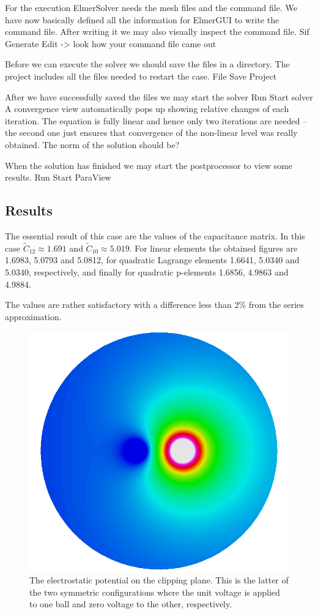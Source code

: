 For the execution 
ElmerSolver needs the mesh files and the command file. We have now basically defined
all the information for ElmerGUI to write the command file. After writing it we may also visually 
inspect the command file.
\ttbegin
Sif 
  Generate
  Edit -> look how your command file came out  
\ttend

Before we can execute the solver we should save the files in a directory. The project includes
all the files needed to restart the case.
\ttbegin
File 
  Save Project
\ttend

After we have successfully saved the files we may start the solver
\ttbegin
Run
  Start solver
\ttend
A convergence view automatically pops up showing relative changes of each iteration.
The equation is fully linear and hence only two iterations are needed -- the second 
one just ensures that convergence of the non-linear level was really obtained. 
The norm of the solution should be?

When the solution has finished we may start the postprocessor to view some results.
\ttbegin
Run
  Start ParaView
\ttend


\subsection*{Results}

The essential result of this case are the values of the capacitance matrix.
In this case $\tilde{C}_{12} \approx 1.691$ and $\tilde{C}_{10} \approx 5.019$.
For linear elements the obtained figures are 1.6983, 5.0793 and 5.0812, 
for quadratic Lagrange elements 1.6641, 5.0340 and 5.0340, respectively, and
finally for quadratic p-elements 1.6856, 4.9863 and 4.9884. 

The values are rather satisfactory with a difference less than 2\% from the series approximation.


\begin{figure}[h]
\centering
\includegraphics[width=120 mm]{ElmerPost_capture2}
\caption{The electrostatic potential on the clipping plane. This is the latter of the two symmetric configurations where the
unit voltage is applied to one ball and zero voltage to the other, respectively.}\label{fg:ballspost}
\end{figure}  

